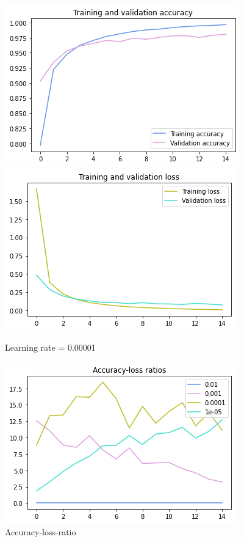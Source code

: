 \documentclass[12pt,a4paper]{scrartcl}		%
\begin{document}
        \begin{figure}[h]
            \centering
            \includegraphics[scale = 0.5]{acc00001.png}
            \includegraphics[scale = 0.5]{loss00001.png}
            \caption{Learning rate = 0.00001}
            \label{fig::cnn00001}
        \end{figure} 

        \begin{figure}[h]
            \centering
            \includegraphics[scale = 1.0]{acc_loss_ratios.png}
            \caption{Accuracy-loss-ratio}
            \label{fig::acc_loss}
        \end{figure}
    
\end{document}
